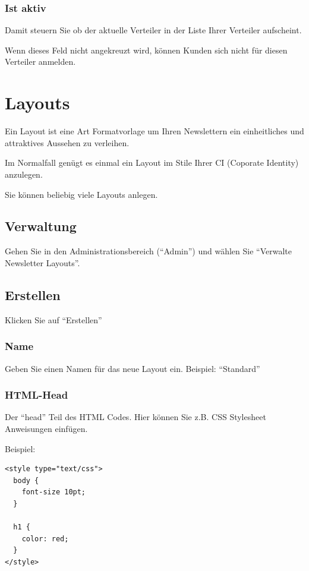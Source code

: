 \documentclass[article, a4paper, oneside, 11pt]{memoir}
\begin{document}
\subsubsection{Ist aktiv}

Damit steuern Sie ob der aktuelle Verteiler in der Liste Ihrer Verteiler aufscheint.

Wenn dieses Feld nicht angekreuzt wird, können Kunden sich nicht für diesen Verteiler anmelden.





\section{Layouts}

Ein Layout ist eine Art Formatvorlage um Ihren Newslettern ein einheitliches und attraktives Aussehen zu verleihen.

Im Normalfall genügt es einmal ein Layout im Stile Ihrer CI (Coporate Identity) anzulegen.

Sie können beliebig viele Layouts anlegen.


\subsection{Verwaltung}

Gehen Sie in den Administrationsbereich ("`Admin"') und wählen Sie "`Verwalte Newsletter Layouts"'.

\subsection{Erstellen}
\label{sec:create-layout}

Klicken Sie auf "`Erstellen"'

\subsubsection{Name}

Geben Sie einen Namen für das neue Layout ein. Beispiel: "`Standard"'

\subsubsection{HTML-Head}

Der "`head"' Teil des HTML Codes. Hier können Sie z.B. CSS Stylesheet Anweisungen einfügen.

Beispiel:

\begin{lstlisting}
<style type="text/css">
  body {
    font-size 10pt; 
  }
  
  h1 { 
    color: red;
  } 
</style>
\end{lstlisting}
\end{document}
